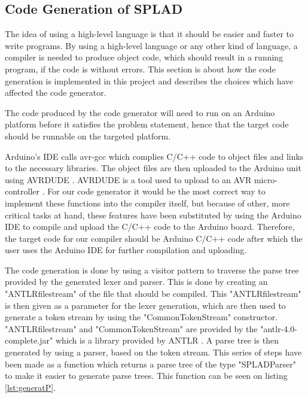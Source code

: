 \subsection{Code Generation of SPLAD}

\label{sec:codegeneration}
The idea of using a high-level language is that it should be easier and faster to write programs. By using a high-level language or any other kind of language, a compiler is needed to produce object code, which should result in a running program, if the code is without errors. This section is about how the code generation is implemented in this project and describes the choices which have affected the code generator.

The code produced by the code generator will need to run on an Arduino platform before it satisfies the problem statement, hence that the target code should be runnable on the targeted platform.

Arduino's IDE calls avr-gcc which complies C/C++ code to object files and links to the necessary libraries. The object files are then uploaded to the Arduino unit using AVRDUDE \citep{Buildproc}. AVRDUDE is a tool used to upload to an AVR micro-controller \citep{AVRDUDE}. For our code generator it would be the most correct way to implement these functions into the compiler itself, but because of other, more critical tasks at hand, these features have been substituted by using the Arduino IDE to compile and upload the C/C++ code to the Arduino board. Therefore, the target code for our compiler should be Arduino C/C++ code after which the user uses the Arduino IDE for further compilation and uploading.


The code generation is done by using a visitor pattern to traverse the parse tree provided by the generated lexer and parser. This is done by creating an "ANTLRfilestream" of the file that should be compiled. This "ANTLRfilestream" is then given as a parameter for the lexer generation, which are then used to generate a token stream by using the "CommonTokenStream" constructor. "ANTLRfilestream" and "CommonTokenStream" are provided by the "antlr-4.0-complete.jar" which is a library provided by ANTLR \citep{DownloadANTLR}. A parse tree is then generated by using a parser, based on the token stream. This series of steps have been made as a function which returns a parse tree of the type "SPLADParser" to make it easier to generate parse trees. This function can be seen on listing \ref{lst:generatP}.

